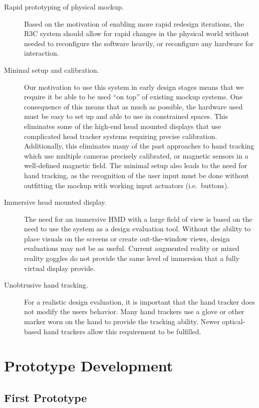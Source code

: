 \begin{description}
    \item [Rapid prototyping of physical mockup.]
        Based on the motivation of enabling more rapid redesign iterations, the R3C system should allow for rapid changes in the physical world without needed to reconfigure the software heavily, or reconfigure any hardware for interaction.
    \item [Minimal setup and calibration.]
        Our motivation to use this system in early design stages means that we require it be able to be used ``on top'' of existing mockup systems.
        One consequence of this means that as much as possible, the hardware used must be easy to set up and able to use in constrained spaces.
        This eliminates some of the high-end head mounted displays that use complicated head tracker systems requiring precise calibration.
        Additionally, this eliminates many of the past approaches to hand tracking which use multiple cameras precisely calibrated, or magnetic sensors in a well-defined magnetic field.
        The minimal setup also leads to the need for hand tracking, as the recognition of the user input must be done without outfitting the mockup with working input actuators (i.e.\ buttons).
    \item [Immersive head mounted display.]
        The need for an immersive HMD with a large field of view is based on the need to use the system as a design evaluation tool.
        Without the ability to place visuals on the screens or create out-the-window views, design evaluations may not be as useful.
        Current augmented reality or mixed reality goggles do not provide the same level of immersion that a fully virtual display provide.
    \item [Unobtrusive hand tracking.]
        For a realistic design evaluation, it is important that the hand tracker does not modify the users behavior.
        Many hand trackers use a glove or other marker worn on the hand to provide the tracking ability.
        Newer optical-based hand trackers allow this requirement to be fulfilled.
\end{description}

\section{Prototype Development}

\subsection{First Prototype}


